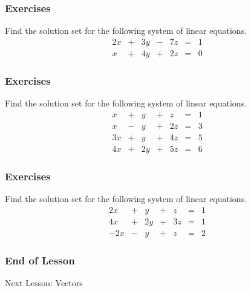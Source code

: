 \documentclass[xcolor=dvipsnames]{beamer}
\begin{document}
\begin{frame}
  \frametitle{Exercises}
  {\ubung} Find the solution set for the following system of linear
  equations.
  \begin{equation}
    \label{eq:aethahth}
    \begin{array}{ccccccc}
      2x&+&3y&-&7z&=&1 \\
      x&+&4y&+&2z&=&0
    \end{array}
  \end{equation}
\end{frame}

\begin{frame}
  \frametitle{Exercises}
  {\ubung} Find the solution set for the following system of linear
  equations.
  \begin{equation}
    \label{eq:aethahth}
    \begin{array}{ccccccc}
      x&+&y&+&z&=&1 \\
      x&-&y&+&2z&=&3 \\
      3x&+&y&+&4z&=&5 \\
      4x&+&2y&+&5z&=&6
    \end{array}
  \end{equation}
\end{frame}

\begin{frame}
  \frametitle{Exercises}
  {\ubung} Find the solution set for the following system of linear
  equations.
  \begin{equation}
    \label{eq:aethahth}
    \begin{array}{ccccccc}
      2x&+&y&+&z&=&1 \\
      4x&+&2y&+&3z&=&1 \\
      -2x&-&y&+&z&=&2
    \end{array}
  \end{equation}
\end{frame}

\begin{frame}
  \frametitle{End of Lesson}
Next Lesson: Vectors
\end{frame}
\end{document}
